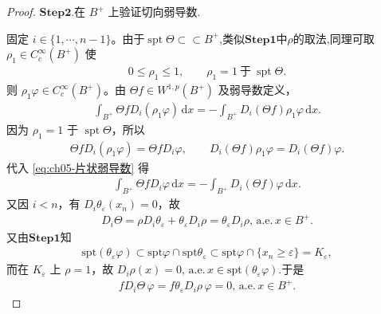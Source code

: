 \documentclass[../../main.tex]{subfiles}
\begin{document}
\begin{proof}
\noindent$\mathbf{Step}\bm{2}$.{\heiti 在 $B^{+}$ 上验证切向弱导数.}

固定 $i\in\{1,\cdots,n-1\}$。由于$\operatorname{spt}\Theta\subset \subset B^+$,类似$\mathbf{Step}\bm{1}$中$\rho$的取法,同理可取 $\rho_1\in C_{c}^{\infty}(B^{+})$ 使
\begin{align}
0\leqslant\rho_1\leqslant1,\qquad \rho_1=1\ \text{于}\ \operatorname{spt}\Theta.
\label{eq:ch05-rho1性质}
\end{align}
则 $\rho_1\varphi\in C_{c}^{\infty}(B^{+})$。由 $\Theta f\in W^{1,p}(B^{+})$ 及弱导数定义，
\begin{align}
\int_{B^{+}}\Theta fD_i(\rho_1\varphi)\,\mathrm{d}x
=-\int_{B^{+}}D_i(\Theta f)\rho_1\varphi\,\mathrm{d}x.
\label{eq:ch05-片状弱导数}
\end{align}
因为 $\rho_1=1$ 于 $\operatorname{spt}\Theta$，所以
\begin{align*}
\Theta fD_i(\rho_1\varphi)=\Theta fD_i\varphi,\qquad
D_i(\Theta f)\rho_1\varphi=D_i(\Theta f)\varphi.
\end{align*}
代入 \eqref{eq:ch05-片状弱导数} 得
\begin{align}
\int_{B^{+}}\Theta fD_i\varphi\,\mathrm{d}x
=-\int_{B^{+}}D_i(\Theta f)\varphi\,\mathrm{d}x.
\label{eq:ch05-片状Theta}
\end{align}
又因 $i<n$，有 $D_i\theta_{\varepsilon}(x_n)=0$，故
\begin{align*}
D_i\Theta=\rho D_i\theta_{\varepsilon}+\theta_{\varepsilon}D_i\rho=\theta_{\varepsilon}D_i\rho,\,\text{a.e.}\,x\in B^+.
\end{align*}
又由$\mathbf{Step}\bm{1}$知
\begin{align*}
\mathrm{spt}(\theta _{\varepsilon}\varphi )\subset \mathrm{spt}\varphi \cap \mathrm{spt}\theta _{\varepsilon}\subset \mathrm{spt}\varphi \cap \{x_n\geqslant \varepsilon \}=K_{\varepsilon},
\end{align*}
而在 $K_{\varepsilon}$ 上 $\rho=1$，故 $D_i\rho(x)=0,\,\text{a.e.}\,x\in \mathrm{spt}(\theta _{\varepsilon}\varphi ).$于是
\begin{align}
fD_i\Theta\,\varphi=f\theta_{\varepsilon}D_i\rho\,\varphi=0,\,\text{a.e.}\,x\in B^+.
\label{eq:ch05-片状切向消失}
\end{align}


\end{proof}
\end{document}

